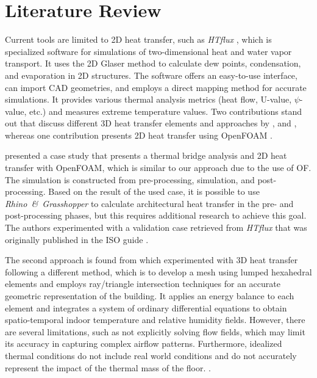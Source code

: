 \section{Literature Review}

Current tools are limited to 2D heat transfer, such as \textit{HTflux} \cite{HTflux}, which is specialized software for simulations of two-dimensional heat and water vapor transport. 
It uses the 2D Glaser method \cite{glaser1959graphisches} to calculate dew points, condensation, and evaporation in 2D structures. 
The software offers an easy-to-use interface, can import CAD geometries, and employs a direct mapping method for accurate simulations. 
It provides various thermal analysis metrics (heat flow, U-value, $\psi$-value, etc.) and measures extreme temperature values. Two contributions stand out that discuss different 3D heat transfer elements and approaches by  \cite{Yang}, and \cite{COMSOL}, whereas one contribution presents 2D heat transfer using OpenFOAM \cite{kastner2020solving}.

\cite{kastner2020solving} presented a case study that presents a thermal bridge analysis and 2D heat transfer with OpenFOAM, which is similar to our approach due to the use of OF. The simulation is constructed from pre-processing, simulation, and post-processing. 
Based on the result of the used case, it is possible to use \textit{Rhino\ \&\ Grasshopper} to calculate architectural heat transfer in the pre- and post-processing phases, but this requires additional research to achieve this goal. 
The authors experimented with a validation case retrieved from \textit{HTflux} that was originally published in the ISO guide \cite{kastner2020solving,ISO}. 

The second approach is found from \cite{Yang} which experimented with 3D heat transfer following a different method, which is to develop a mesh using lumped hexahedral elements and employs ray/triangle intersection techniques for an accurate geometric representation of the building. 
It applies an energy balance to each element and integrates a system of ordinary differential equations to obtain spatio-temporal indoor temperature and relative humidity fields. 
However, there are several limitations, such as not explicitly solving flow fields, which may limit its accuracy in capturing complex airflow patterns. 
Furthermore, idealized thermal conditions do not include real world conditions and do not accurately represent the impact of the thermal mass of the floor. 
 \cite{Yang}. 


